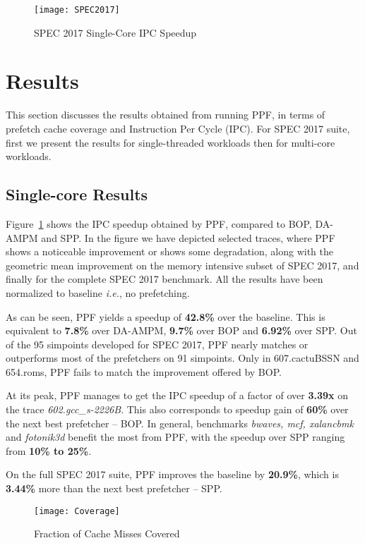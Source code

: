 \begin{figure}[ht]
\texttt{[image: SPEC2017]}
\caption{SPEC 2017 Single-Core IPC Speedup}
\label{Fig:SPEC2017_1core}
\end{figure}

\section{Results}
\label{Results}

This section discusses the results obtained from running PPF, in
terms of prefetch cache coverage and Instruction Per
Cycle (IPC).  For SPEC 2017 suite, first we present the
results for single-threaded workloads then for multi-core
workloads.

\subsection{Single-core Results}
\label{Results-Single}


Figure~\ref{Fig:SPEC2017_1core} shows the IPC speedup obtained by
PPF, compared to BOP, DA-AMPM and SPP. 
In the figure we have depicted selected traces, where PPF shows a 
noticeable improvement or shows some degradation, along with the 
geometric mean improvement on the memory intensive subset of SPEC 2017, 
and finally for the complete SPEC 2017 benchmark. 
All the results have been normalized to baseline \textit{i.e.}, no
prefetching.  

As can be seen, PPF yields a speedup of \textbf{42.8\%} over
the baseline. This is equivalent to \textbf{7.8\%} over DA-AMPM, \textbf{9.7\%} over BOP
and \textbf{6.92\%} over SPP.  Out of the 95 simpoints developed for SPEC 2017, 
PPF nearly matches or outperforms most of the prefetchers on 91 simpoints.
Only in 607.cactuBSSN and 654.roms, PPF fails to match the improvement 
offered by BOP.

At its peak, PPF manages to get the IPC speedup of a factor of
over \textbf{3.39x} on the trace \textit{602.gcc\_s-2226B}.  This also
corresponds to speedup gain of \textbf{60\%} over the next best
prefetcher -- BOP. 
In general, benchmarks \textit{bwaves, mcf, xalancbmk} 
and \textit{fotonik3d} benefit the most from PPF, with the speedup over
SPP ranging from \textbf{10\% to 25\%}.

On the full SPEC 2017 suite, PPF improves the baseline by \textbf{20.9\%},
which is \textbf{3.44\%} more than the next best prefetcher -- SPP.

\begin{figure}[h]
\texttt{[image: Coverage]}
\caption{Fraction of Cache Misses Covered}
\label{Fig:Coverage}
\end{figure}

